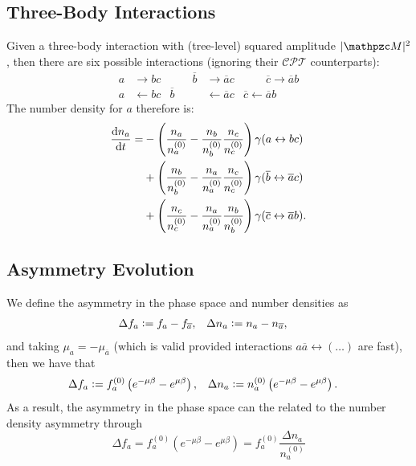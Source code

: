 \documentclass{scrartcl}
\begin{document}
\subsection{Three-Body Interactions}%
\label{sec:three-body_interactions}

Given a three-body interaction with (tree-level) squared amplitude
\(\abs{\pzcM}^2\), then there are six possible interactions (ignoring their
\(\mathcal{CPT}\) counterparts):
\begin{equation}
  \begin{aligned}
    a           & \to bc                         & \qquad
    \overline b & \to \overline ac               & \qquad
    \overline c \to \overline ab                          \\
    a           & \gets bc                       &
    \overline b & \gets \overline ac
                & \overline c \gets \overline ab
  \end{aligned}
\end{equation}
The number density for \(a\) therefore is:
\begin{equation}
  \begin{aligned}
    \frac{\mathop{}\!\mathrm{d}{n_a}}{\mathop{}\!\mathrm{d}{t}} =
     & - \left( \frac{n_a}{n_a^{(0)}} - \frac{n_b}{n_b^{(0)}} \frac{n_c}{n_c^{(0)}} \right) \gamma(a \leftrightarrow bc)                       \\
     & + \left( \frac{n_b}{n_b^{(0)}} - \frac{n_a}{n_a^{(0)}} \frac{n_c}{n_c^{(0)}} \right) \gamma(\overline b \leftrightarrow \overline a c)  \\
     & + \left( \frac{n_c}{n_c^{(0)}} - \frac{n_a}{n_a^{(0)}} \frac{n_b}{n_b^{(0)}} \right) \gamma(\overline c \leftrightarrow \overline a b).
  \end{aligned}
\end{equation}

\subsection{Asymmetry Evolution}%
\label{sec:asymmetry_evolution}

We define the asymmetry in the phase space and number densities as
\begin{align}
  \Delta f_a & \vcentcolon= f_a - f_{\overline a}, &
  \Delta n_a & \vcentcolon= n_a - n_{\overline a},
\end{align}
and taking \(\mu_a = - \mu_{\overline a}\) (which is valid provided
interactions \(a \overline a \leftrightarrow (\dots)\) are fast), then we have
that
\begin{align}
  \Delta f_a & \vcentcolon= f_a^{(0)} \left( e^{-\mu \beta} - e^{\mu \beta} \right), &
  \Delta n_a & \vcentcolon= n_a^{(0)} \left( e^{-\mu \beta} - e^{\mu \beta} \right).
\end{align}
As a result, the asymmetry in the phase space can the related to the number
density asymmetry through
\begin{equation}
  \Delta f_a = f_a^{(0)} \left( e^{-\mu \beta} - e^{\mu \beta} \right)
  = f_a^{(0)} \frac{\Delta n_a}{n_a^{(0)}}
\end{equation}
\end{document}
